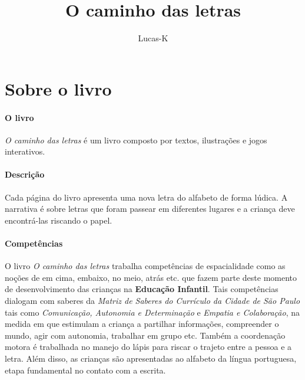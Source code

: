 \documentclass[11pt]{extarticle}
\newcommand{\AutorLivro}{Lucas-K}
\newcommand{\TituloLivro}{O caminho das letras}
\newcommand{\colaborador}{{Paulo Pompermaier e Renier Silva}}
\begin{document}
\title{\TituloLivro}
\author{\AutorLivro}
\def\authornotes{\colaborador}

\date{}
\maketitle


\tableofcontents



\section{Sobre o livro}

\paragraph{O livro} 
\textit{O caminho das letras} é um livro composto por textos,
ilustrações e jogos interativos. 
\paragraph{Descrição} 
Cada página do livro apresenta uma nova letra do alfabeto de forma lúdica.
A narrativa é sobre letras que foram passear em diferentes lugares e a 
criança deve encontrá-las riscando o papel.
\paragraph{Competências} 
O livro \textit{O caminho das letras} trabalha competências de espacialidade como as noções de em cima, embaixo, no meio, atrás etc. que fazem parte deste momento de desenvolvimento das crianças na \textbf{Educação Infantil}. Tais competências dialogam com saberes da \textit{Matriz de Saberes do Currículo da Cidade de São Paulo} tais como \textit{Comunicação, Autonomia e Determinação} e \textit{Empatia e Colaboração}, na medida em que estimulam a criança a partilhar informações, compreender o mundo, agir com autonomia, trabalhar em grupo etc. Também a coordenação motora é trabalhada no manejo do lápis para riscar o trajeto entre a pessoa e a letra. Além disso, as crianças são apresentadas ao alfabeto da língua portuguesa, etapa fundamental no contato com a escrita.
\end{document}
